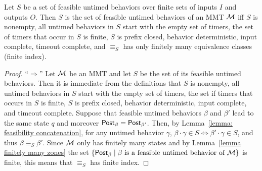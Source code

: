 \begin{theorem}
\label{Nerode theorem}
Let $S$ be a set of feasible untimed behaviors over finite sets of inputs $I$ and outputs $O$.
Then $S$ is the set of feasible untimed behaviors of an MMT ${\cal M}$ iff $S$ is nonempty, all untimed behaviors in $S$
start with the empty set of timers, the set of timers that occur in $S$ is finite,
$S$ is prefix closed, behavior deterministic, input complete, timeout complete,
and $\equiv_S$ has only finitely many equivalence classes (finite index).
\end{theorem}
\iflong
\begin{proof}

``$\Rightarrow$'' Let ${\cal M}$ be an MMT and let $S$ be the set of its feasible untimed behaviors.
Then it is immediate from the definitions that $S$ is nonempty, all untimed behaviors in $S$
start with the empty set of timers, the set if timers that occurs in $S$ is finite,
$S$ is prefix closed, behavior deterministic, input complete, and timeout complete.
Suppose that feasible untimed behaviors $\beta$ and $\beta'$ lead to the same state $q$ and moreover $\mathsf{Post}_{\beta} = \mathsf{Post}_{\beta'}$.
Then, 
by Lemma~\ref{lemma: feasibility concatenation},
for any untimed behavior $\gamma$, $\beta \cdot \gamma \in S \Leftrightarrow \beta' \cdot \gamma \in S$, and thus
$\beta \equiv_S \beta'$.
Since ${\cal M}$ only has finitely many states and by Lemma~\ref{lemma finitely many zones} the set
$\{ \mathsf{Post}_{\beta} \mid \beta \mbox{ is a feasible untimed behavior of } {\cal M} \}$ is finite, this means that
$\equiv_S$ has finite index.


\end{proof}
